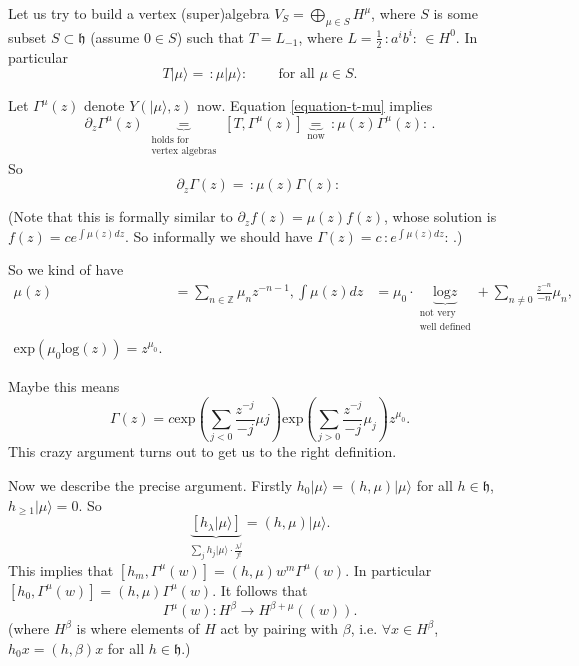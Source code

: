 \medskip\noindent
Let us try to build a vertex (super)algebra
$V_S=\bigoplus_{\mu \in S}H^\mu$, where $S$ is some
subset $S \subset \mathfrak{h}$ (assume $0 \in S$)
such that $T=L_{-1}$, where $L=\frac{1}{2}\,:\!a^ib^i\!:\, \in H^0$.
In particular 
\begin{equation}
\label{equation-t-mu}
T|\mu\rangle=\,:\!\mu|\mu\rangle\!:\,\qquad \text{for all }\mu \in S.
\end{equation}

\noindent
Let $\Gamma^\mu(z)$ denote $Y(|\mu\rangle,z)$ now.
Equation \ref{equation-t-mu} implies
$$
\partial_z\Gamma^\mu(z)\underbrace{=}_{\substack{\text{holds for}
 \\\text{vertex
algebras} }}[T,\Gamma^\mu(z)]
\underbrace{=}_{\text{now}}
\,:\!\mu(z)\Gamma^\mu(z)\!:\,.
$$
So
\begin{equation}
\label{equation-t-mu2}
\partial_z\Gamma(z)=\,:\!\mu(z)\Gamma(z)\!:\,
\end{equation}

\noindent
(Note that this is formally similar to
$\partial_zf(z)=\mu(z)f(z)$, whose solution is
$f(z)=ce^{\int \mu(z)dz}$. So informally we
should have $\Gamma(z)=c\,:\!e^{\int \mu(z)dz}\!:\,$.)

So we kind of have
\begin{align*}
\mu(z)&=\sum_{n \in \mathbb{Z}}\mu_nz^{-n-1},
\int\mu(z)dz&=\mu_0\cdot \underbrace{\text{log}z}_{\substack{\text{not very} \\
\text{well defined} }}+\sum_{n \neq 0}\frac{z^{-n}}{-n}\mu_n,\\
\text{exp}(\mu_0\text{log}(z))=z^{\mu_0}.
\end{align*}

Maybe this means
\begin{equation}
\label{equation-maybe-this-means}
\Gamma(z)=c \text{exp}\left(\sum_{j<0}\frac{z^{-j}}{-j}\mu j\right)
\text{exp}\left(\sum_{j>0}\frac{z^{-j}}{-j}\mu_j\right)z^{\mu_0}.
\end{equation}
This crazy argument turns out to get us to the right definition.

\medskip\noindent
Now we describe the precise argument.
Firstly $h_0|\mu\rangle=(h,\mu)|\mu\rangle$ for all $h \in \mathfrak{h}$,
$h_{\geq 1}|\mu\rangle=0$.
So
 $$
\underbrace{[h_\lambda |\mu\rangle]}
_{\sum_jh_j|\mu\rangle\cdot\frac{\lambda^j}{j!}}=(h,\mu)|\mu\rangle.
$$
This implies that $[h_m,\Gamma^\mu(w)]=(h,\mu)w^m\Gamma^\mu(w)$.
In particular $[h_0,\Gamma^\mu(w)]=(h,\mu)\Gamma^\mu(w)$.
It follows that
$$
\Gamma^\mu(w):H^\beta \to H^{\beta+\mu}((w)).
$$
(where $H^\beta$ is where elements of $H$ act by pairing with $\beta$, i.e.
$\forall x \in H^\beta$, $h_0x=(h,\beta)x$ for all $h \in \mathfrak{h}$.)

